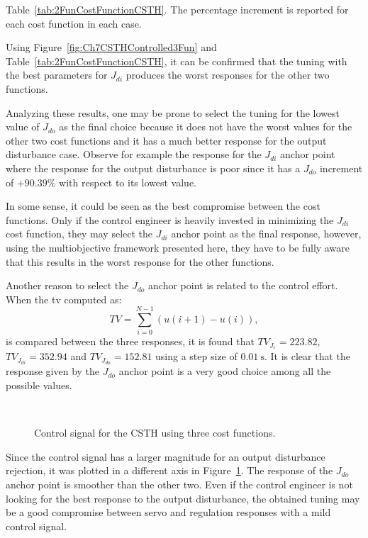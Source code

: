 %
Table~\ref{tab:2FunCostFunctionCSTH}. The percentage increment is reported for each cost function in each case.

Using Figure~\ref{fig:Ch7CSTHControlled3Fun} and Table~\ref{tab:2FunCostFunctionCSTH}, it can be confirmed that the tuning with the best parameters for $J_{di}$ produces the worst responses for the other two functions. 

Analyzing these results, one may be prone to select the tuning for the lowest value of $J_{do}$ as the final choice because it does not have the worst values for the other two cost functions and it has a much better response for the output disturbance case. Observe for example the response for the $J_{di}$ anchor point where the response for the output disturbance is poor since it has a $J_{do}$ increment of $+90.39\%$ with respect to its lowest value. 

In some sense, it could be seen as the best compromise between the cost functions. Only if the control engineer is heavily invested in minimizing the $J_{di}$ cost function, they may select the $J_{di}$ anchor point as the final response, however, using the multiobjective framework presented here, they have to be fully aware that this results in the worst response for the other functions.

Another reason to select the $J_{do}$ anchor point is related to the control effort. When the \gls{tv} computed as:
\begin{equation*}
TV = \sum_{i=0}^{N-1}\left(  u(i+1)-u(i)\right),
\end{equation*}
is compared between the three responses, it is found that $TV_{J_r} = 223.82$, $TV_{J_{di}} = 352.94$ and $TV_{J_{do}} = 152.81$ using a step size of $\SI{0.01}{\second}$. It is clear that the response given by the $J_{do}$ anchor point is a very good choice among all the possible values. 
%
\begin{figure}[tb]
	\centering
	\\
	\caption{Control signal for the CSTH using three cost functions.}
	\label{fig:Ch7CSTHControlledCV3Fun}
\end{figure}
%
Since the control signal has a larger magnitude for an output disturbance rejection, it was plotted in a different axis in Figure~\ref{fig:Ch7CSTHControlledCV3Fun}. The response of the $J_{do}$ anchor point is smoother than the other two. Even if the control engineer is not looking for the best response to the output disturbance, the obtained tuning may be a good compromise between servo and regulation responses with a mild control signal.

